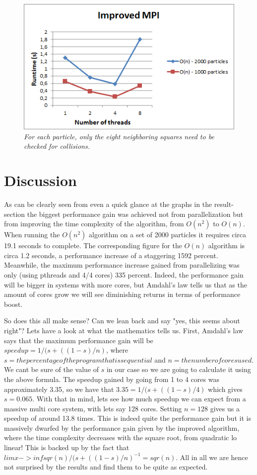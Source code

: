 \documentclass[11pt,a4paper]{article}
\begin{document}
\begin{figure}[htb]
\centering
\includegraphics[scale=0.8]{pics/mpi2.png}
\caption{\emph{For each particle, only the eight neighboring squares need to be checked for collisions.}}
\label{fig:gird}
\end{figure}
\newpage
\section{Discussion}
As can be clearly seen from even a quick glance at the graphs in the result-section the biggest performance gain was achieved not from parallelization but from improving the time complexity of the algorithm, from $O(n^{2})$ to $O(n)$. When running the $O(n^{2})$ algorithm on a set of 2000 particles it requires circa 19.1 seconds to complete. The corresponding figure for the $O(n)$ algorithm is circa 1.2 seconds, a performance increase of a staggering 1592 percent. Meanwhile, the maximum performance increase gained from parallelizing was only (using pthreads and 4/4 cores) 335 percent. Indeed, the performance gain will be bigger in systems with more cores, but Amdahl's law tells us that as the amount of cores grow we will see diminishing returns in terms of performance boost.

So does this all make sense? Can we lean back and say "yes, this seems about right"? Lets have a look at what the mathematics tells us. First, Amdahl's law says that the maximum performance gain will be $speedup = 1/(s+((1 - s)/n)$, where $s = the percentage of the program that is sequential$ and $n = the number of cores used$. We cant be sure of the value of $s$ in our case so we are going to calculate it using the above formula. The speedup gained by going from 1 to 4 cores was approximately 3.35, so we have that $3.35 = 1/(s+((1 - s)/4)$ which gives $s = 0.065$. With that in mind, lets see how much speedup we can expect from a massive multi core system, with lets say 128 cores. Setting $n = 128$ gives us a speedup of around 13.8 times. This is indeed quite the performance gain but it is massively dwarfed by the performance gain given by the improved algorithm, where the time complexity decreases with the square root, from quadratic lo linear! This is backed up by the fact that $lim x -> inf sqr(n)/(s+((1 - s)/n)^{-1} = sqr(n)$. All in all we are hence not surprised by the results and find them to be quite as expected.
\end{document}
